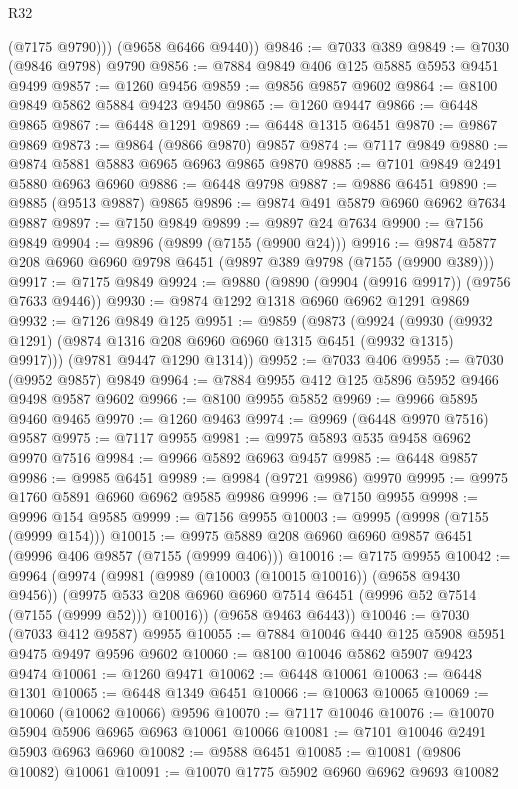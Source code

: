 \begin{lexlean}{R32}
\begin{coremodule}
          (@7175 @9790)))
      (@9658 @6466 @9440))
@9846 := @7033 @389
@9849 := @7030 (@9846 @9798) @9790
@9856 := @7884 @9849 @406 @125 @5885 @5953 @9451 @9499
@9857 := @1260 @9456
@9859 := @9856 @9857 @9602
@9864 := @8100 @9849 @5862 @5884 @9423 @9450
@9865 := @1260 @9447
@9866 := @6448 @9865
@9867 := @6448 @1291
@9869 := @6448 @1315 @6451
@9870 := @9867 @9869
@9873 := @9864 (@9866 @9870) @9857
@9874 := @7117 @9849
@9880 := @9874 @5881 @5883 @6965 @6963 @9865 @9870
@9885 := @7101 @9849 @2491 @5880 @6963 @6960
@9886 := @6448 @9798
@9887 := @9886 @6451
@9890 := @9885 (@9513 @9887) @9865
@9896 := @9874 @491 @5879 @6960 @6962 @7634 @9887
@9897 := @7150 @9849
@9899 := @9897 @24 @7634
@9900 := @7156 @9849
@9904 := @9896 (@9899 (@7155 (@9900 @24)))
@9916 := @9874 @5877 @208 @6960 @6960 @9798 @6451 (@9897 @389 @9798 (@7155 (@9900 @389)))
@9917 := @7175 @9849
@9924 := @9880 (@9890 (@9904 (@9916 @9917)) (@9756 @7633 @9446))
@9930 := @9874 @1292 @1318 @6960 @6962 @1291 @9869
@9932 := @7126 @9849 @125
@9951 := @9859
    (@9873
      (@9924 (@9930 (@9932 @1291) (@9874 @1316 @208 @6960 @6960 @1315 @6451 (@9932 @1315) @9917)))
      (@9781 @9447 @1290 @1314))
@9952 := @7033 @406
@9955 := @7030 (@9952 @9857) @9849
@9964 := @7884 @9955 @412 @125 @5896 @5952 @9466 @9498 @9587 @9602
@9966 := @8100 @9955 @5852
@9969 := @9966 @5895 @9460 @9465
@9970 := @1260 @9463
@9974 := @9969 (@6448 @9970 @7516) @9587
@9975 := @7117 @9955
@9981 := @9975 @5893 @535 @9458 @6962 @9970 @7516
@9984 := @9966 @5892 @6963 @9457
@9985 := @6448 @9857
@9986 := @9985 @6451
@9989 := @9984 (@9721 @9986) @9970
@9995 := @9975 @1760 @5891 @6960 @6962 @9585 @9986
@9996 := @7150 @9955
@9998 := @9996 @154 @9585
@9999 := @7156 @9955
@10003 := @9995 (@9998 (@7155 (@9999 @154)))
@10015 := @9975 @5889 @208 @6960 @6960 @9857 @6451 (@9996 @406 @9857 (@7155 (@9999 @406)))
@10016 := @7175 @9955
@10042 := @9964
    (@9974
      (@9981
        (@9989 (@10003 (@10015 @10016)) (@9658 @9430 @9456))
        (@9975 @533 @208 @6960 @6960 @7514 @6451 (@9996 @52 @7514 (@7155 (@9999 @52))) @10016))
      (@9658 @9463 @6443))
@10046 := @7030 (@7033 @412 @9587) @9955
@10055 := @7884 @10046 @440 @125 @5908 @5951 @9475 @9497 @9596 @9602
@10060 := @8100 @10046 @5862 @5907 @9423 @9474
@10061 := @1260 @9471
@10062 := @6448 @10061
@10063 := @6448 @1301
@10065 := @6448 @1349 @6451
@10066 := @10063 @10065
@10069 := @10060 (@10062 @10066) @9596
@10070 := @7117 @10046
@10076 := @10070 @5904 @5906 @6965 @6963 @10061 @10066
@10081 := @7101 @10046 @2491 @5903 @6963 @6960
@10082 := @9588 @6451
@10085 := @10081 (@9806 @10082) @10061
@10091 := @10070 @1775 @5902 @6960 @6962 @9693 @10082

\end{coremodule}
\end{lexlean}
